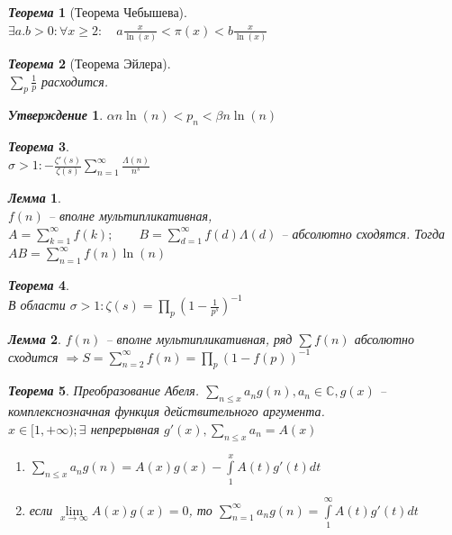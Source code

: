 \documentclass[a4paper,12pt]{article}
\newtheorem{teo2}{\textit{Теорема}}
\newtheorem{utv2}{\textit{Утверждение}}
\newtheorem{lem2}{\textit{Лемма}}
\newcommand{\q}{\quad}
\newcommand{\Ra}{\Rightarrow}
\newcommand{\bb}[1]{\mathbb{#1}}
\newcommand{\SL}{\sum\limits}
\newcommand{\IL}{\int\limits}
\begin{document}
\begin{formbox}{}
\begin{teo2}[Теорема Чебышева]\q\\
$\exists a.b > 0: \forall x \ge 2:\q a\frac{x}{\ln(x)} <\pi(x) <b\frac{x}{\ln(x)} $
\end{teo2}
\end{formbox}
\begin{formbox}{}
\begin{teo2}[Теорема Эйлера]\q\\$\sum_p \frac{1}{p}$ расходится.
\end{teo2}
\end{formbox}
\begin{formbox}{}
\begin{utv2} $\alpha n \ln(n) < p_n < \beta n \ln(n)   $
\end{utv2}
\end{formbox}
\begin{formbox}{}
\begin{teo2}\q\\
$\sigma > 1: -\frac{\zeta'(s)}{\zeta(s)}  \SL_{n=1}^\infty \frac{\Lambda(n)}{n^s} $
\end{teo2}
\end{formbox}
\begin{formbox}{}
\begin{lem2}\q\\
$f(n)$ -- вполне мультипликативная, $A = \SL_{k=1}^\infty f(k);\q\q B = \SL_{d=1}^\infty f(d)\Lambda(d)$ -- абсолютно сходятся. Тогда $AB = \SL_{n=1}^\infty f(n) \ln(n)$
\end{lem2}
\end{formbox}
\begin{formbox}{}
\begin{teo2}\q\\
В области $\sigma > 1: \zeta(s) = \prod\limits_p (1 - \frac{1}{p^s})^{-1}$
\end{teo2}
\end{formbox}
\begin{formbox}{}
\begin{lem2}
$f(n)$ -- вполне мультипликативная, ряд $\sum f(n)$ абсолютно сходится $\Ra S = \SL_{n=2}^\infty f(n) = \prod\limits_p (1-f(p))^{-1}  $
\end{lem2}
\end{formbox}
\begin{formbox}{}
\begin{teo2}
Преобразование Абеля. $\SL_{n\le x} a_n g(n), a_n\in \bb{C}, g(x)$ -- комплекснозначная функция действительного аргумента.\\
$x\in[1,+\infty); \exists$ непрерывная $g'(x), \SL_{n \le x}a_n = A(x)$\\
\begin{enumerate}
    \item $\SL_{n\le x}a_ng(n) = A(x)g(x) - \IL_1^x A(t)g'(t)dt $
    \item если $\lim\limits_{x\to\infty} A(x)g(x) = 0$, то $\SL_{n=1}^\infty a_ng(n) = \IL_1^\infty A(t)g'(t)dt $
\end{enumerate}
\end{teo2}
\end{formbox}
\end{document}
